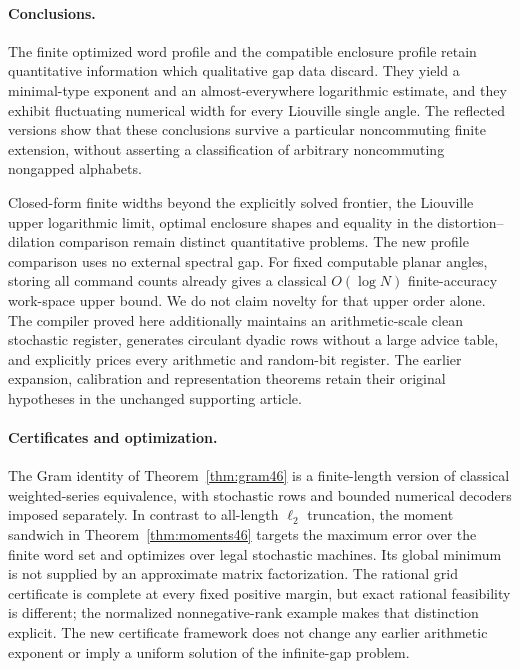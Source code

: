 \paragraph{Conclusions.}
The finite optimized word profile and the compatible enclosure profile retain quantitative information which qualitative gap data discard. They yield a minimal-type exponent and an almost-everywhere logarithmic estimate, and they exhibit fluctuating numerical width for every Liouville single angle. The reflected versions show that these conclusions survive a particular noncommuting finite extension, without asserting a classification of arbitrary noncommuting nongapped alphabets.

Closed-form finite widths beyond the explicitly solved frontier, the Liouville upper logarithmic limit, optimal enclosure shapes and equality in the distortion--dilation comparison remain distinct quantitative problems. The new profile comparison uses no external spectral gap. For fixed computable planar angles, storing all command counts already gives a classical $O(\log N)$ finite-accuracy work-space upper bound. We do not claim novelty for that upper order alone. The compiler proved here additionally maintains an arithmetic-scale clean stochastic register, generates circulant dyadic rows without a large advice table, and explicitly prices every arithmetic and random-bit register. The earlier expansion, calibration and representation theorems retain their original hypotheses in the unchanged supporting article.


\paragraph{Certificates and optimization.}
The Gram identity of Theorem~\ref{thm:gram46} is a finite-length
version of classical weighted-series equivalence, with stochastic
rows and bounded numerical decoders imposed separately. In contrast
to all-length $\ell_2$ truncation, the moment sandwich in
Theorem~\ref{thm:moments46} targets the maximum error over the finite
word set and optimizes over legal stochastic machines. Its global
minimum is not supplied by an approximate matrix factorization.
The rational grid certificate is complete at every fixed positive
margin, but exact rational feasibility is different; the normalized
nonnegative-rank example makes that distinction explicit. The new
certificate framework does not change any earlier arithmetic exponent
or imply a uniform solution of the infinite-gap problem.
